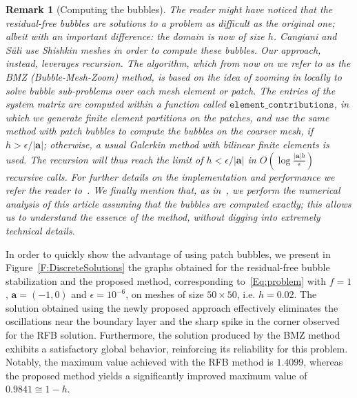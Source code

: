 \documentclass{article}
\newcommand{\delete}[1]{{\color{lightgray}#1}}
\newtheorem{rem}[thm]{Remark}
\newcommand{\T}{\ensuremath{\mathcal{T}}\xspace}
\newcommand{\aaa}{\ensuremath{\mathbf{a}}\xspace}
\newcommand{\qtfa}{\quad\text{for all }}
\newcommand{\Change}[2]{{\delete{#1 }\color{blue}#2}}
\begin{document}
\begin{rem}[Computing the bubbles]\rm
The reader might have noticed that the residual-free bubbles are solutions to a problem as difficult as the original one; albeit with an important difference: the domain is now of size $h$.
Cangiani and S\"uli use Shishkin meshes in order to compute these bubbles.
Our approach, instead, leverages \emph{recursion}.
The algorithm, which from now on we refer to as the BMZ (Bubble-Mesh-Zoom) method, is based on the idea of zooming in locally to solve bubble sub-problems over each mesh element or patch.
The entries of the system matrix are computed within a function called $\texttt{element\_contributions}$, in which we generate finite element partitions on the \emph{patches}, and use the same method with patch bubbles to compute the bubbles on the coarser mesh, if $h>\epsilon/|\aaa|$; otherwise, a usual Galerkin method with bilinear finite elements is used. 
The recursion will thus reach the limit of $h < \epsilon/|\aaa|$ in $O(\log \frac{|\mathbf{a}|h}{\epsilon})$ recursive calls.
For further details on the implementation and performance we refer the reader to~\cite{BMZ}.
We finally mention that, as in~\cite{Cangiani2005long}, we perform the numerical analysis of this article assuming that the bubbles are computed exactly; this allows us to understand the essence of the method, without digging into extremely technical details.
\end{rem}

In order to quickly show the advantage of using patch bubbles, we present in Figure~\ref{F:DiscreteSolutions} the graphs obtained for the residual-free bubble stabilization and the proposed method, corresponding to~\eqref{Eq:problem} with $f=1$, $\aaa = (-1,0)$ and $\epsilon=10^{-6}$, on meshes of size $50\times50$, i.e. $h=0.02$. 
The solution obtained using the newly proposed approach effectively eliminates the oscillations near the boundary layer and the sharp spike in the corner observed for the RFB solution. Furthermore, the solution produced by the BMZ method exhibits a satisfactory global behavior, reinforcing its reliability for this problem. Notably, the maximum value achieved with the RFB method is $1.4099$, whereas the proposed method yields a significantly improved maximum value of $0.9841\cong1-h$.

\end{document}
